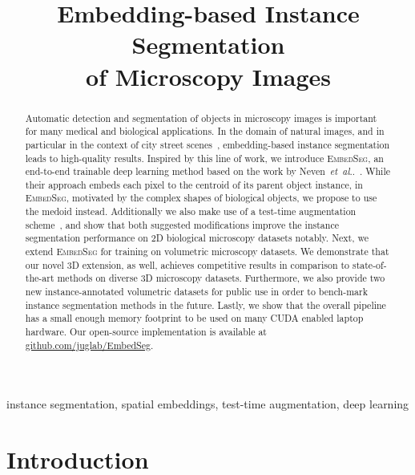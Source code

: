 \documentclass{midl} %
\title[Embedding-based Instance Segmentation of Microscopy Images]{Embedding-based Instance Segmentation \\of Microscopy Images}
\makeatletter
\newcommand{\EmbedSeg}{\mbox{\textsc{EmbedSeg}}\xspace}
\DeclareRobustCommand\onedot{\futurelet\@let@token\@onedot}
\def\@onedot{\ifx\@let@token.\else.\null\fi\xspace}
\def\etal{\emph{et~al}\onedot}
\makeatother
\begin{document}
\maketitle

\begin{abstract}
Automatic detection and segmentation of objects in microscopy images is important for many medical and biological applications.
In the domain of natural images, and in particular in the context of city street scenes~\cite{Cordts2016Cityscapes}, embedding-based instance segmentation leads to high-quality results.
Inspired by this line of work, we introduce \EmbedSeg, an end-to-end trainable deep learning method based on the work by Neven~\etal~\cite{neven2019}. 
While their approach embeds each pixel to the centroid of its parent object instance, in \EmbedSeg, motivated by the complex shapes of biological objects, we propose to use the medoid instead.
Additionally we also make use of a test-time augmentation scheme~\cite{wang2019}, and show that both suggested modifications improve the instance segmentation performance on 2D biological microscopy datasets notably.
 Next, we extend \EmbedSeg for training on volumetric microscopy datasets. 
 We demonstrate that our novel 3D extension, as well, achieves competitive results in comparison to state-of-the-art methods on diverse 3D microscopy datasets.
Furthermore, we also provide two new instance-annotated volumetric datasets for public use in order to bench-mark instance segmentation methods in the future.
Lastly, we show that the overall pipeline has a small enough memory footprint to be used on many CUDA enabled laptop hardware.
Our open-source implementation is available at \url{github.com/juglab/EmbedSeg}.
\end{abstract}

\begin{keywords}
instance segmentation, spatial embeddings, test-time augmentation, deep learning
\end{keywords}

\section{Introduction}
\end{document}
